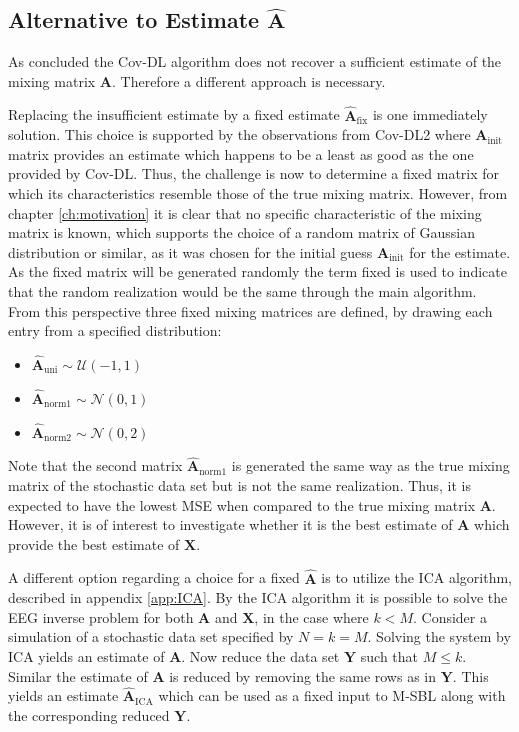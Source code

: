 \subsection{Alternative to Estimate $\hat{\textbf{A}}$}  
As concluded the Cov-DL algorithm does not recover a sufficient estimate of the mixing matrix $\mathbf{A}$. 
Therefore a different approach is necessary. 

Replacing the insufficient estimate by a fixed estimate $\hat{\mathbf{A}}_{\text{fix}}$ is one immediately solution. 
This choice is supported by the observations from Cov-DL2 where $\mathbf{A}_{\text{init}}$ matrix provides an estimate which happens to be a least as good as the one provided by Cov-DL. 
Thus, the challenge is now to determine a fixed matrix for which its characteristics resemble those of the true mixing matrix. 
However, from chapter \ref{ch:motivation} it is clear that no specific characteristic of the mixing matrix is known, which supports the choice of a random matrix of Gaussian distribution or similar, as it was chosen for the initial guess $\mathbf{A}_{\text{init}}$ for the estimate. 
As the fixed matrix will be generated randomly the term fixed is used to indicate that the random realization would be the same through the main algorithm.
From this perspective three fixed mixing matrices are defined, by drawing each entry from a specified distribution: 
\begin{itemize}
\item[] $\hat{\mathbf{A}}_{\text{uni}} \sim \mathcal{U}(-1,1)$
\item[] $\hat{\mathbf{A}}_{\text{norm1}} \sim \mathcal{N}(0,1)$                                           
\item[] $\hat{\mathbf{A}}_{\text{norm2}} \sim \mathcal{N}(0,2)$ 
\end{itemize}
Note that the second matrix $\hat{\mathbf{A}}_{\text{norm1}}$ is generated the same way as the true mixing matrix of the stochastic data set but is not the same realization. 
Thus, it is expected to have the lowest MSE when compared to the true mixing matrix $\mathbf{A}$. 
However, it is of interest to investigate whether it is the best estimate of $\mathbf{A}$ which provide the best estimate of $\mathbf{X}$. 

A different option regarding a choice for a fixed $\hat{\mathbf{A}}$ is to utilize the ICA algorithm, described in appendix \ref{app:ICA}. 
By the ICA algorithm it is possible to solve the EEG inverse problem for both $\mathbf{A}$ and $\mathbf{X}$, in the case where $k < M$.
Consider a simulation of a stochastic data set specified by $N = k = M$. 
Solving the system by ICA yields an estimate of $\mathbf{A}$. 
Now reduce the data set $\mathbf{Y}$ such that $M \leq k$. 
Similar the estimate of $\mathbf{A}$ is reduced by removing the same rows as in $\mathbf{Y}$. 
This yields an estimate $\hat{\mathbf{A}}_{\text{ICA}}$ which can be used as a fixed input to M-SBL along with the corresponding reduced $\mathbf{Y}$.

